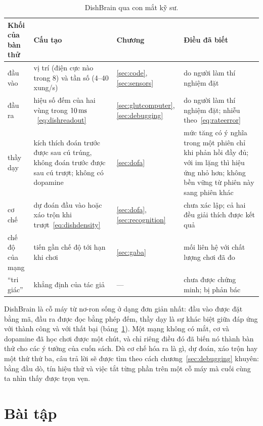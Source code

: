 \begin{table}[t]
\centering
\footnotesize
\setlength{\tabcolsep}{4pt}
\renewcommand{\arraystretch}{1.15}
\begin{tabular}{>{\raggedright}p{2.1cm}>{\raggedright}p{4.2cm}>{\raggedright}p{1.9cm}>{\raggedright\arraybackslash}p{4.6cm}}
\toprule
Khối của bàn thử & Cấu tạo & Chương & Điều đã biết \\
\midrule
đầu vào & vị trí (điện cực nào trong 8) và tần số (4--40 xung/s) & \ref{sec:code}, \ref{sec:sensors} & do người làm thí nghiệm đặt \\
đầu ra & hiệu số đếm của hai vùng trong $10\,\text{ms}$~\eqref{eq:dishreadout} & \ref{sec:glutcomputer}, \ref{sec:debugging} & do người làm thí nghiệm đặt; nhiễu theo~\eqref{eq:rateerror} \\
thầy dạy & kích thích đoán trước được sau cú trúng, không đoán trước được sau cú trượt; không có dopamine & \ref{sec:dofa} & mức tăng có ý nghĩa trong một phiên chỉ khi phản hồi đầy đủ; với im lặng thì hiệu ứng nhỏ hơn; không bền vững từ phiên này sang phiên khác \\
cơ chế & dự đoán đầu vào hoặc xáo trộn khi trượt~\eqref{eq:dishdensity} & \ref{sec:dofa}, \ref{sec:recognition} & chưa xác lập; cả hai đều giải thích được kết quả \\
chế độ của mạng & tiến gần chế độ tới hạn khi chơi & \ref{sec:gaba} & mối liên hệ với chất lượng chơi đã đo \\
``tri giác'' & khẳng định của tác giả & --- & chưa được chứng minh; bị phản bác \\
\bottomrule
\end{tabular}
\caption{DishBrain qua con mắt kỹ sư.}
\label{tab:dishbrain}
\end{table}

DishBrain là cỗ máy từ nơ-ron sống ở dạng đơn giản nhất: đầu vào được đặt bằng mã, đầu ra được đọc bằng phép đếm, thầy dạy là sự khác biệt giữa đáp ứng với thành công và với thất bại (bảng~\ref{tab:dishbrain}). Một mạng không có mắt, cơ và dopamine đã học chơi được một chút, và chỉ riêng điều đó đã biến nó thành bàn thử cho các ý tưởng của cuốn sách. Dù cơ chế hóa ra là gì, dự đoán, xáo trộn hay một thứ thứ ba, câu trả lời sẽ được tìm theo cách chương~\ref{sec:debugging} khuyên: bằng đầu dò, tín hiệu thử và việc tắt từng phần trên một cỗ máy mà cuối cùng ta nhìn thấy được trọn vẹn.

\section{Bài tập}

